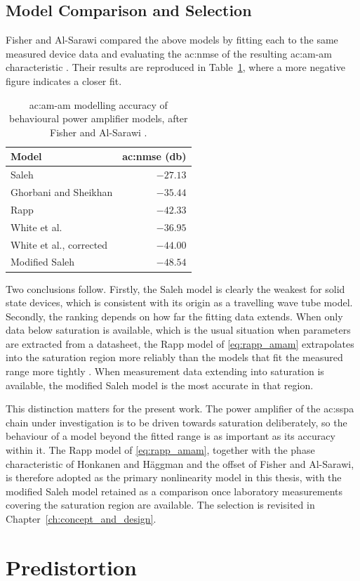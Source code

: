 \subsection{Model Comparison and Selection}\label{sec:pa_model_selection}

Fisher and Al-Sarawi compared the above models by fitting each to the same measured device data and evaluating the \gls{ac:nmse} of the resulting \gls{ac:am-am} characteristic \cite{fisher}. Their results are reproduced in Table~\ref{table:pa_model_nmse}, where a more negative figure indicates a closer fit.

\begin{table}[tb]
  \caption{\gls{ac:am-am} modelling accuracy of behavioural power amplifier models, after
           Fisher and Al-Sarawi \cite{fisher}.}
  \label{table:pa_model_nmse}
  \begin{center}
    \begin{tabular}{l|r}
      Model & \gls{ac:nmse} (\unit{\decibel}) \\
      \hline
      Saleh \cite{saleh}                        & $-27.13$ \\
      Ghorbani and Sheikhan \cite{ghorbani}     & $-35.44$ \\
      Rapp \cite{rapp}                          & $-42.33$ \\
      White et al.\ \cite{white}                & $-36.95$ \\
      White et al., corrected \cite{fisher}     & $-44.00$ \\
      Modified Saleh \cite{odroma}              & $-48.54$ \\
    \end{tabular}
  \end{center}
\end{table}

Two conclusions follow. Firstly, the Saleh model is clearly the weakest for solid state devices, which is consistent with its origin as a travelling wave tube model. Secondly, the ranking depends on how far the fitting data extends. When only data below saturation is available, which is the usual situation when parameters are extracted from a datasheet, the Rapp model of \eqref{eq:rapp_amam} extrapolates into the saturation region more reliably than the models that fit the measured range more tightly \cite{fisher}. When measurement data extending into saturation is available, the modified Saleh model is the most accurate in that region.

This distinction matters for the present work. The power amplifier of the \gls{ac:sspa} chain under investigation is to be driven towards saturation deliberately, so the behaviour of a model beyond the fitted range is as important as its accuracy within it. The Rapp model of \eqref{eq:rapp_amam}, together with the phase characteristic of Honkanen and H\"aggman and the offset of Fisher and Al-Sarawi, is therefore adopted as the primary nonlinearity model in this thesis, with the modified Saleh model retained as a comparison once laboratory measurements covering the saturation region are available. The selection is revisited in Chapter~\ref{ch:concept_and_design}.

\section{Predistortion}